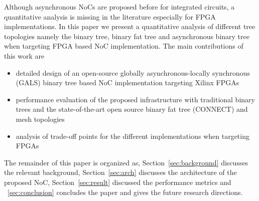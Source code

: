 Although asynchronous NoCs are proposed before for integrated circuits, a quantitative analysis is missing in the literature especially for FPGA implementations.
In this paper we present a quantitative analysis of different tree topologies namely the binary tree, binary fat tree and asynchronous binary tree when targeting FPGA based NoC implementation. 
The main contributions of this work are
\begin{itemize}
\item detailed design of an open-source globally asynchronous-locally synchronous (GALS) binary tree based NoC implementation targeting Xilinx FPGAs
\item performance evaluation of the proposed infrastructure with traditional binary trees and the state-of-the-art open source binary fat tree (CONNECT) and mesh topologies
\item analysis of trade-off points for the different implementations when targeting FPGAs
\end{itemize}
The remainder of this paper is organized as, Section~\ref{sec:background} discusses the relevant background, Section~\ref{sec:arch} discusses the architecture of the proposed NoC, Section~\ref{sec:result} discussed the performance metrics and ~\ref{sec:conclusion} concludes the paper and gives the future research directions.